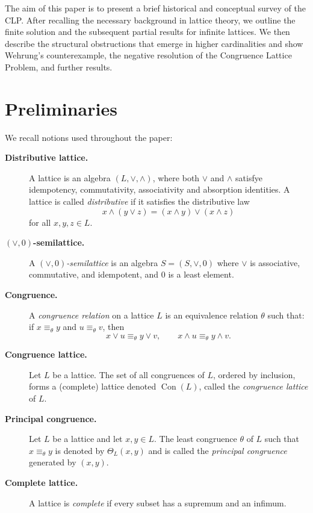 ﻿\documentclass{article}
\begin{document}
The aim of this paper is to present a brief historical and conceptual survey of
the CLP. After recalling the necessary background in lattice theory, we outline
the finite solution and the subsequent partial results for infinite lattices.
We then describe the structural obstructions that emerge in higher cardinalities
and show Wehrung’s counterexample, the negative resolution of the Congruence Lattice Problem,
and further results.

\section{Preliminaries}

We recall notions used throughout the paper:

\begin{description}
\item[\textbf{Distributive lattice.}] A lattice is  an algebra $(L,\vee,\wedge)$, where both $\vee$ and $\wedge$ satisfye idempotency, commutativity, associativity and absorption identities.
A lattice is called \textit{distributive} if it satisfies the distributive law
\[
x \wedge (y \vee z) = (x \wedge y) \vee (x \wedge z)
\]
for all $x,y,z \in L$.

\item[\textbf{$(\vee,0)$-semilattice.}]
A \emph{$(\vee,0)$-semilattice} is an algebra $S=(S,\vee,0)$ where $\vee$ is associative, commutative, and idempotent, and $0$ is a least element.

\item[\textbf{Congruence.}] A \textit{congruence relation} on a lattice $L$ is an equivalence relation $\theta$ such that: if $x \equiv_{\theta} y$ and $u \equiv_{\theta} v$, then
\[
x \vee u \equiv_{\theta} y \vee v, \qquad x \wedge u \equiv_{\theta} y \wedge v.
\]

\item[\textbf{Congruence lattice.}]
Let $L$ be a lattice. The set of all congruences of $L$, ordered by inclusion, forms a (complete) lattice denoted $\operatorname{Con}(L)$, called the \emph{congruence lattice} of $L$.

\item[\textbf{Principal congruence.}]
Let $L$ be a lattice and let $x,y\in L$. The least congruence $\theta$ of $L$ such that $x\equiv_\theta y$ is denoted by $\Theta_L(x,y)$ and is called the \emph{principal congruence} generated by $(x,y)$.

\item[\textbf{Complete lattice.}] A lattice is \textit{complete} if every subset has a supremum and an infimum.


\end{description}
\end{document}
